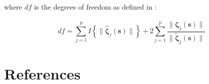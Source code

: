 \documentclass[authoryear, review, 11pt]{elsarticle}
\begin{document}
        where $df$ is the degrees of freedom as defined in \cite{Yuan-Lin-2006}:

        \begin{equation}
            df = \sum_{j=1}^p I \left\{ \| \hat{\bm{\zeta}}_j(\bm{s}) \| \right\} + 2 \sum_{j=1}^p \frac{\| \hat{\bm{\zeta}}_j(\bm{s}) \|}{\| \tilde{\bm{\zeta}}_j(\bm{s}) \|}
        \end{equation}


\section{References}


\end{document}
